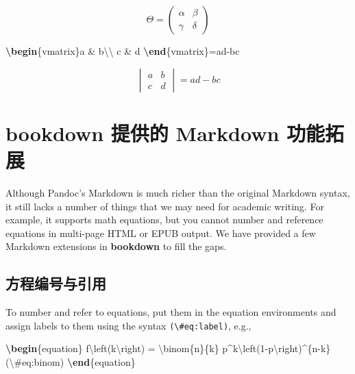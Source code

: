 \documentclass[
  12pt,
]{krantz}
\newenvironment{Shaded}{\begin{snugshade}}{\end{snugshade}}
\newcommand{\ExtensionTok}[1]{#1}
\newcommand{\KeywordTok}[1]{\textcolor[rgb]{0.13,0.29,0.53}{\textbf{#1}}}
\newcommand{\NormalTok}[1]{#1}
\newcommand{\SpecialCharTok}[1]{\textcolor[rgb]{0.00,0.00,0.00}{#1}}
\newcommand{\SpecialStringTok}[1]{\textcolor[rgb]{0.31,0.60,0.02}{#1}}
\theoremstyle{definition}
\theoremstyle{definition}
\theoremstyle{definition}
\theoremstyle{definition}
\theoremstyle{remark}
\begin{document}
\[\Theta = \begin{pmatrix}\alpha & \beta\\
\gamma & \delta
\end{pmatrix}\]

\begin{Shaded}
\begin{Highlighting}[]
\SpecialStringTok{$$}\KeywordTok{\textbackslash{}begin}\NormalTok{\{}\ExtensionTok{vmatrix}\NormalTok{\}}\SpecialStringTok{a \& b}\SpecialCharTok{\textbackslash{}\textbackslash{}}
\SpecialStringTok{c \& d}
\KeywordTok{\textbackslash{}end}\NormalTok{\{}\ExtensionTok{vmatrix}\NormalTok{\}}\SpecialStringTok{=ad{-}bc$$}
\end{Highlighting}
\end{Shaded}

\[\begin{vmatrix}a & b\\
c & d
\end{vmatrix}=ad-bc\]

\hypertarget{bookdown-ux63d0ux4f9bux7684-markdown-ux529fux80fdux62d3ux5c55}{%
\section{bookdown 提供的 Markdown 功能拓展}\label{bookdown-ux63d0ux4f9bux7684-markdown-ux529fux80fdux62d3ux5c55}}

Although Pandoc's Markdown is much richer than the original Markdown syntax, it still lacks a number of things that we may need for academic writing. For example, it supports math equations, but you cannot number and reference equations in multi-page HTML or EPUB output. We have provided a few Markdown extensions in \textbf{bookdown} to fill the gaps.

\hypertarget{equations}{%
\subsection{方程编号与引用}\label{equations}}

To number and refer to equations, put them in the equation environments and assign labels to them using the syntax \texttt{(\textbackslash{}\#eq:label)}, e.g.,

\begin{Shaded}
\begin{Highlighting}[]
\KeywordTok{\textbackslash{}begin}\NormalTok{\{}\ExtensionTok{equation}\NormalTok{\}}\SpecialStringTok{ }
\SpecialStringTok{  f}\SpecialCharTok{\textbackslash{}left}\SpecialStringTok{(k}\SpecialCharTok{\textbackslash{}right}\SpecialStringTok{) = }\SpecialCharTok{\textbackslash{}binom}\SpecialStringTok{\{n\}\{k\} p\^{}k}\SpecialCharTok{\textbackslash{}left}\SpecialStringTok{(1{-}p}\SpecialCharTok{\textbackslash{}right}\SpecialStringTok{)\^{}\{n{-}k\}}
\SpecialStringTok{  (}\SpecialCharTok{\textbackslash{}\#}\SpecialStringTok{eq:binom)}
\KeywordTok{\textbackslash{}end}\NormalTok{\{}\ExtensionTok{equation}\NormalTok{\} }
\end{Highlighting}
\end{Shaded}
\end{document}

